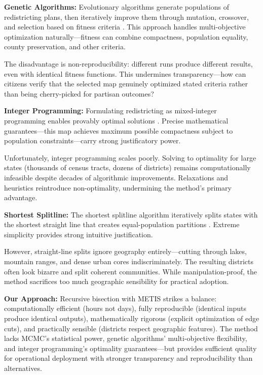 \textbf{Genetic Algorithms:} Evolutionary algorithms generate populations of redistricting plans, then iteratively improve them through mutation, crossover, and selection based on fitness criteria \cite{liu2016pear}. This approach handles multi-objective optimization naturally—fitness can combine compactness, population equality, county preservation, and other criteria.

The disadvantage is non-reproducibility: different runs produce different results, even with identical fitness functions. This undermines transparency—how can citizens verify that the selected map genuinely optimized stated criteria rather than being cherry-picked for partisan outcomes?

\textbf{Integer Programming:} Formulating redistricting as mixed-integer programming enables provably optimal solutions \cite{garfinkel1970optimal}. Precise mathematical guarantees—this map achieves maximum possible compactness subject to population constraints—carry strong justificatory power.

Unfortunately, integer programming scales poorly. Solving to optimality for large states (thousands of census tracts, dozens of districts) remains computationally infeasible despite decades of algorithmic improvements. Relaxations and heuristics reintroduce non-optimality, undermining the method's primary advantage.

\textbf{Shortest Splitline:} The shortest splitline algorithm iteratively splits states with the shortest straight line that creates equal-population partitions \cite{duchin2018gerrymandering}. Extreme simplicity provides strong intuitive justification.

However, straight-line splits ignore geography entirely—cutting through lakes, mountain ranges, and dense urban cores indiscriminately. The resulting districts often look bizarre and split coherent communities. While manipulation-proof, the method sacrifices too much geographic sensibility for practical adoption.

\textbf{Our Approach:} Recursive bisection with METIS strikes a balance: computationally efficient (hours not days), fully reproducible (identical inputs produce identical outputs), mathematically rigorous (explicit optimization of edge cuts), and practically sensible (districts respect geographic features). The method lacks MCMC's statistical power, genetic algorithms' multi-objective flexibility, and integer programming's optimality guarantees—but provides sufficient quality for operational deployment with stronger transparency and reproducibility than alternatives.

